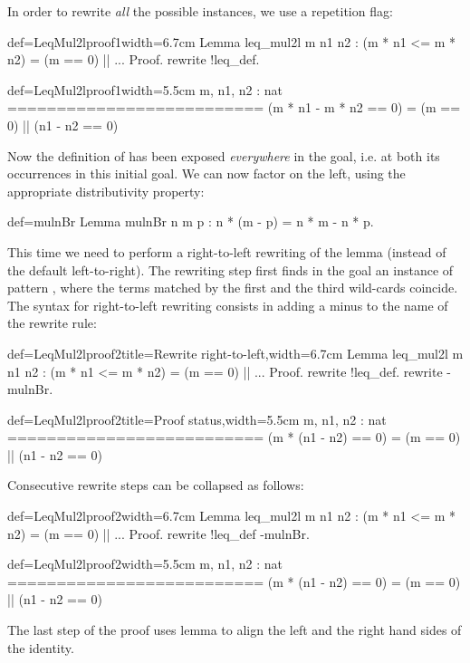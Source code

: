 In order to rewrite \emph{all} the possible instances, we use a
repetition flag:

\begin{coq}{def=LeqMul2lproof1}{width=6.7cm}
Lemma leq_mul2l m n1 n2 :
 (m * n1 <= m * n2) = (m == 0) || ...
Proof.
rewrite !leq_def.
\end{coq}
\begin{coqout}{def=LeqMul2lproof1}{width=5.5cm}
m, n1, n2 : nat
==========================
(m * n1 - m * n2 == 0) =
  (m == 0) || (n1 - n2 == 0)
\end{coqout}

Now the definition of \C{<=} has been exposed
\emph{everywhere} in the goal, i.e. at both its occurrences in this
initial goal. We can now factor  on the left, using the appropriate
distributivity property:

\begin{coq}{def=mulnBr}{}
Lemma mulnBr n m p : n * (m - p) = n * m - n * p.
\end{coq}
This time we need to perform a right-to-left rewriting of the
 lemma (instead of the
default left-to-right). The rewriting step first finds in the goal an
instance of pattern \C{(_ * _ - _ * _)}, where the terms matched by
the first and the third wild-cards coincide. The syntax for
right-to-left rewriting consists in adding a minus \C{-} to the name
of the rewrite rule:


\begin{coq}{def=LeqMul2lproof2}{title=Rewrite right-to-left,width=6.7cm}
Lemma leq_mul2l m n1 n2 :
 (m * n1 <= m * n2) = (m == 0) || ...
Proof.
rewrite !leq_def. rewrite -mulnBr.
\end{coq}
\begin{coqout}{def=LeqMul2lproof2}{title=Proof status,width=5.5cm}
m, n1, n2 : nat
==========================
(m * (n1 - n2) == 0) =
  (m == 0) || (n1 - n2 == 0)
\end{coqout}
Consecutive rewrite steps can be collapsed as follows:

\begin{coq}{def=LeqMul2lproof2}{width=6.7cm}
Lemma leq_mul2l m n1 n2 :
 (m * n1 <= m * n2) = (m == 0) || ...
Proof.
rewrite !leq_def -mulnBr.
\end{coq}
\begin{coqout}{def=LeqMul2lproof2}{width=5.5cm}
m, n1, n2 : nat
==========================
(m * (n1 - n2) == 0) =
  (m == 0) || (n1 - n2 == 0)
\end{coqout}
The last step of the proof uses lemma  to align the left
and the right hand sides of the identity.

